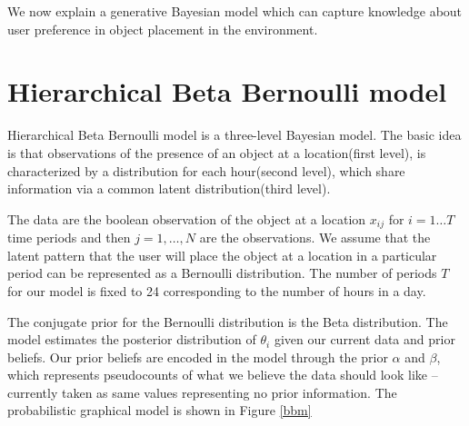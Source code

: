 We now explain a generative Bayesian model which can capture knowledge about user preference in object placement in the environment.

\section{Hierarchical Beta Bernoulli model}

Hierarchical Beta Bernoulli model is a three-level Bayesian model. The basic idea is that observations of the presence of an object at a location(first level), is characterized by a distribution for each hour(second level), which share information via a common latent distribution(third level).

The data are the boolean observation of the object at a location $x_{ij}$ for $i = 1 \dots T$ time periods and then $j = 1, \dots , N$  are the observations.  We assume that the latent pattern that the user will place the object at a  location in a particular period can be represented as a Bernoulli distribution. The number of periods $T$ for our model is fixed to 24 corresponding to the number of hours in a day. 

The conjugate prior for the Bernoulli distribution is the Beta distribution. The model estimates the posterior distribution of $\theta_i$ given our current data and prior beliefs. Our prior beliefs are encoded in the model through the prior $\alpha$ and $\beta$, which represents pseudocounts of what we believe the data should look like – currently taken as same values representing no prior information. The probabilistic graphical model is shown in Figure \ref{bbm}

